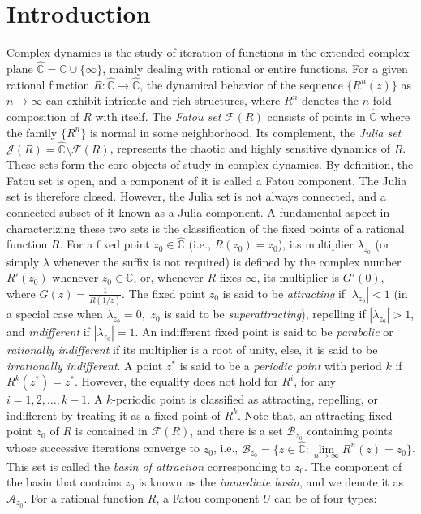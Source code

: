\documentclass[12pt]{article}
\begin{document}
\section{Introduction}
Complex dynamics is the study of iteration of functions in the extended complex plane $ \widehat{\mathbb{C}}=\mathbb{C}\cup \{\infty\} $, mainly dealing with rational or entire functions. For a given rational function $ R: \widehat{\mathbb{C}} \to \widehat{\mathbb{C}} $, the dynamical behavior of the sequence \( \{R^n(z)\} \) as \( n \to \infty \) can exhibit intricate and rich structures, where $R^n$ denotes the $n$-fold composition of $R$ with itself. The \textit{Fatou set}  $ \mathcal{F}(R) $ consists of points in \( \widehat{\mathbb{C}} \) where the family \( \{R^n\} \) is normal in some neighborhood. Its complement, the \textit{Julia set} $ \mathcal{J}(R) = \widehat{\mathbb{C}} \setminus \mathcal{F}(R) $, represents the chaotic and highly sensitive dynamics of $ R $. These sets form the core objects of study in complex dynamics. By definition, the Fatou set is open, and a component of it is called a Fatou component. The Julia set is therefore closed. However, the Julia set is not always connected, and a connected subset of it known as a Julia component.
A fundamental aspect in characterizing these two sets is the classification of the fixed points of a rational function $R$. For a fixed point $z_0\in \widehat{\mathbb{C}}$ (i.e., $R(z_0)=z_0$), its multiplier $\lambda_{z_0}$ (or simply $\lambda$ whenever the suffix is not required) is defined by the complex number $R'(z_0)$ whenever $z_0\in \mathbb{C}$, or, whenever $R$ fixes $\infty$, its multiplier is $G'(0)$, where $G(z)=\frac{1}{R(1/z)}$. The fixed point $z_0$ is said to be \textit{attracting} if $|\lambda_{z_0}|<1$ (in a special case when $\lambda_{z_0}=0,$ $z_0$ is said to be \textit{superattracting}), repelling if $|\lambda_{z_0}|>1$, and \textit{indifferent} if $|\lambda_{z_0}|=1$. An indifferent fixed point is said to be \textit{parabolic} or \textit{rationally indifferent} if its multiplier is a root of unity, else, it is said to be \textit{irrationally indifferent}. A point $z^*$ is said to be a \textit{periodic point} with period $k$ if $R^k(z^*)=z^*$. However, the equality does not hold for $R^i$, for any $i=1,2,\dots, k-1$. A $k$-periodic point is classified as attracting, repelling, or indifferent by treating it as a fixed point of $R^k$.
Note that, an attracting fixed point $z_0$ of $R$ is contained in $\mathcal{F}(R)$, and there is a set $\mathcal{B}_{z_0}$ containing points whose successive iterations converge to $z_0$, i.e., $\mathcal{B}_{z_0}=\{z\in \widehat{\mathbb{C}}: \lim\limits_{n\to \infty}R^n(z)=z_0\}$. This set is called the \textit{basin of attraction} corresponding to $z_0$. The component of the basin that contains $z_0$ is known as the \textit{immediate basin}, and we denote it as $\mathcal{A}_{z_0}$. For a rational function $R$, a Fatou component $U$ can be of four types:
\end{document}
